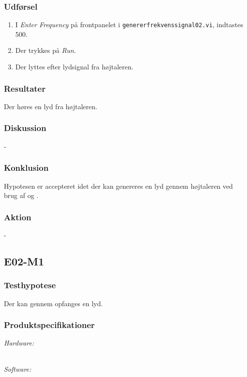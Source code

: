 		\subsubsection{Udførsel}
			\begin{enumerate} 
				\item I \textit{Enter Frequency} på frontpanelet i \texttt{genererfrekvenssignal02.vi}, indtastes 500. 
				\item Der trykkes på \textit{Run}. 
				\item Der lyttes efter lydsignal fra højtaleren.  
			\end{enumerate}
			
		\subsubsection{Resultater}
		Der høres en lyd fra højtaleren. 
		\subsubsection{Diskussion} 
		-
		\subsubsection{Konklusion}
		Hypotesen er accepteret idet der kan genereres en lyd gennem højtaleren ved brug af \arduino{} og \labview. 
		
		\subsubsection{Aktion}
		- 
		
	\subsection{E02-M1}
		\subsubsection{Testhypotese}
		Der kan gennem \mikrofon opfanges en lyd. 
		
		\subsubsection{Produktspecifikationer}
	
			\textit{Hardware:}\\
			\mikrofon\\
			\PC
	
			\textit{Software:}\\
			\labview\\
			\onlineg\\
	
